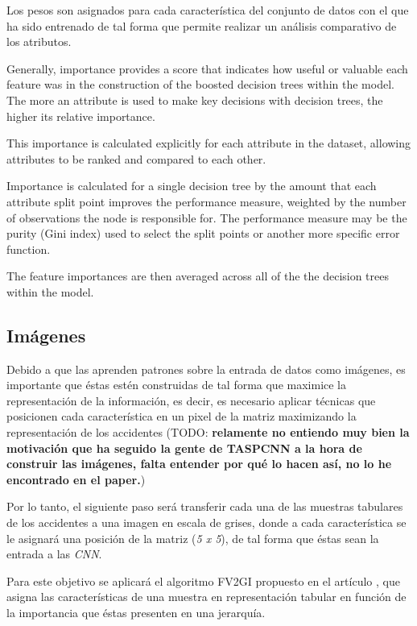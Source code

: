         Los pesos son asignados para cada característica del conjunto de datos con el que ha sido entrenado  de tal forma que permite realizar un análisis comparativo de los atributos.


        Generally, importance provides a score that indicates how useful or valuable each feature was in the construction of the boosted decision trees within the model. The more an attribute is used to make key decisions with decision trees, the higher its relative importance.

        This importance is calculated explicitly for each attribute in the dataset, allowing attributes to be ranked and compared to each other.

        Importance is calculated for a single decision tree by the amount that each attribute split point improves the performance measure, weighted by the number of observations the node is responsible for. The performance measure may be the purity (Gini index) used to select the split points or another more specific error function.

        The feature importances are then averaged across all of the the decision trees within the model.




    \subsection{Imágenes}


        Debido a que las  aprenden patrones sobre la entrada de datos como imágenes, es importante que éstas estén construidas de tal forma que maximice la representación de la información, es decir, es necesario aplicar técnicas que posicionen cada característica en un pixel de la matriz maximizando la representación de los accidentes (TODO: \textbf{relamente no entiendo muy bien la motivación que ha seguido la gente de TASPCNN a la hora de construir las imágenes, falta entender por qué lo hacen así, no lo he encontrado en el paper.})

        Por lo tanto, el siguiente paso será transferir cada una de las muestras tabulares de los accidentes a una imagen en escala de grises, donde a cada característica se le asignará una posición de la matriz (\textit{5 x 5}), de tal forma que éstas sean la entrada a las \textit{CNN}.

        Para este objetivo se aplicará el algoritmo FV2GI propuesto en el artículo \cite{TASPCNN}, que asigna las características de una muestra en representación tabular en función de la importancia que éstas presenten en una jerarquía.

